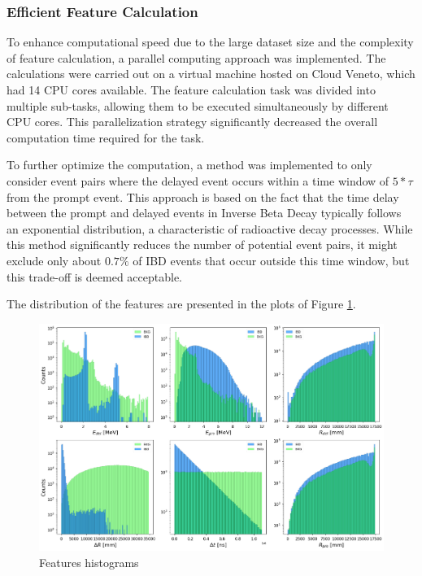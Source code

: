\subsubsection*{Efficient Feature Calculation}
To enhance computational speed due to the large dataset size and the complexity of feature calculation, a parallel computing approach was implemented. The calculations were carried out on a virtual machine hosted on Cloud Veneto, which had 14 CPU cores available. The feature calculation task was divided into multiple sub-tasks, allowing them to be executed simultaneously by different CPU cores. This parallelization strategy significantly decreased the overall computation time required for the task.

To further optimize the computation, a method was implemented to only consider event pairs where the delayed event occurs within a time window of $5*\tau$ from the prompt event. This approach is based on the fact that the time delay between the prompt and delayed events in Inverse Beta Decay typically follows an exponential distribution, a characteristic of radioactive decay processes. While this method significantly reduces the number of potential event pairs, it might exclude only about $0.7\%$ of IBD events that occur outside this time window, but this trade-off is deemed acceptable.

The distribution of the features are presented in the plots of Figure \ref{fig:hist_features}.


\begin{figure}[h!]
	\centering
	\includegraphics[width=0.9\linewidth]{Images/hist_features.png}
	\caption{Features histograms}
	\label{fig:hist_features}
\end{figure}



